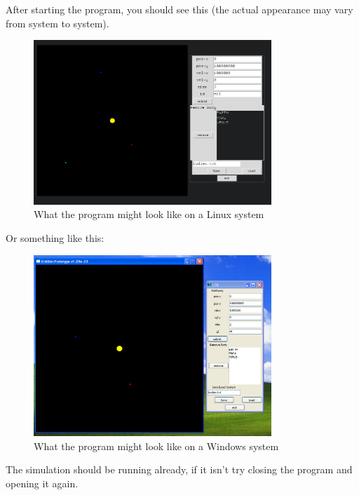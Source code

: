 \documentclass[a4paper,11pt,titlepage]{article}
\begin{document}
After starting the program, you should see this (the actual appearance may vary
from system to system).
\begin{figure}[H]
	\centering
	\includegraphics[width=0.8\textwidth]{../img/start.png}
	\caption{What the program might look like on a Linux system}
\end{figure}

Or something like this:

\begin{figure}[H]
	\centering
	\includegraphics[width=0.8\textwidth]{../img/win.png}
	\caption{What the program might look like on a Windows system}
\end{figure}
The simulation should be running already, if it isn't try closing the program
and opening it again.
\end{document}
